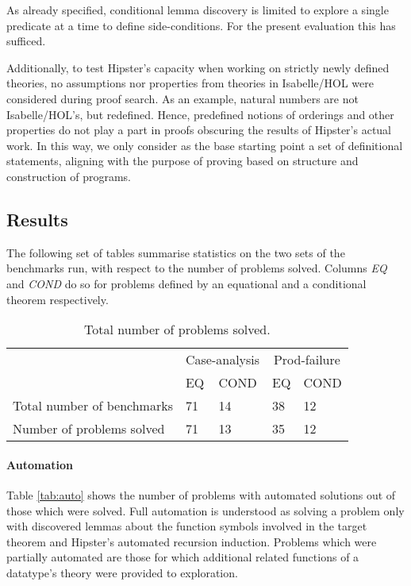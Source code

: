 As already specified, conditional lemma discovery is limited to explore a single predicate at a time to define side-conditions.
%
For the present evaluation this has sufficed.

Additionally, to test Hipster's capacity when working on strictly newly defined theories, no assumptions nor properties from theories in Isabelle/HOL were considered during proof search.
%
As an example, natural numbers are not Isabelle/HOL's, but redefined.
%
Hence, predefined notions of orderings and other properties do not play a part in proofs obscuring the results of Hipster's actual work.
%
In this way, we only consider as the base starting point a set of definitional statements, aligning with the purpose of proving based on structure and construction of programs.


\subsection{Results}

The following set of tables summarise statistics on the two sets of the benchmarks run, with respect to the number of problems solved.
%
Columns \emph{EQ} and \emph{COND} do so for problems defined by an equational and a conditional theorem respectively.

\noindent \begin{table}[htbp]
\begin{tabularx}{\textwidth}{l | X X | X X}
  & \multicolumn{2}{c|}{Case-analysis} & \multicolumn{2}{c}{Prod-failure} \\
  &  EQ & COND & EQ & COND \\
  \hline
  Total number of benchmarks & 71 & 14 & 38 & 12 \\
  Number of problems solved & 71 & 13 & 35 & 12 \\
\end{tabularx}
\caption{Total number of problems solved.}
\label{tab:total}
\end{table}


\paragraph{Automation}
%
Table \ref{tab:auto} shows the number of problems with automated solutions out of those which were solved.
%
Full automation is understood as solving a problem only with discovered lemmas about the function symbols involved in the target theorem and Hipster's automated recursion induction.
%
Problems which were partially automated are those for which additional related functions of a datatype's theory were provided to exploration.

